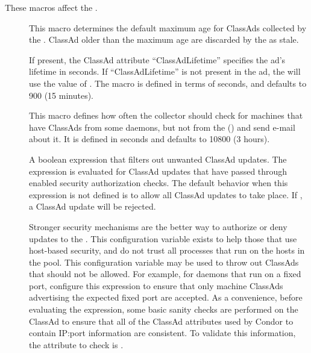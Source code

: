 These macros affect the .
\begin{description}
  
\item[] \label{param:ClassadLifetime} This
  macro determines the default maximum age for ClassAds collected by the
  .  ClassAd older than the maximum age are
  discarded by the  as stale.

  If present, the ClassAd attribute ``ClassAdLifetime'' specifies the
  ad's lifetime in seconds.  If ``ClassAdLifetime'' is not present in
  the ad, the  will use the value of
  .  The macro is defined in terms of
  seconds, and defaults to 900 (15 minutes).
  
\item[]
  \label{param:MasterCheckInterval}  This macro defines how often the
  collector should check for machines that have ClassAds from some
  daemons, but not from the  ()
  and send e-mail about it.  It is defined in seconds and 
  defaults to 10800 (3 hours).

\item[]
  \label{param:CollectorRequirements} A boolean expression
  that filters out unwanted ClassAd updates.  The
  expression is evaluated for ClassAd updates that have 
  passed through enabled security authorization checks.
  The default behavior when this expression is not
  defined is to allow all ClassAd updates to take place.
  If , a ClassAd update will be rejected.

  Stronger security mechanisms are the better way to
  authorize or deny updates to the .
  This configuration variable exists to help those that
  use host-based security, and
  do not trust all processes that run on the hosts in the pool.
  This configuration variable may be used to throw out ClassAds that
  should not be allowed.  For example, for
   daemons that run on a fixed port,
  configure this expression to ensure that 
  only machine ClassAds advertising the expected
  fixed port are accepted.  As a convenience, before evaluating the
  expression, some basic sanity checks are performed on the ClassAd to
  ensure that all of the ClassAd attributes used by Condor to contain
  IP:port information are consistent.  To validate this
  information, the attribute to check is .
 


\end{description}
